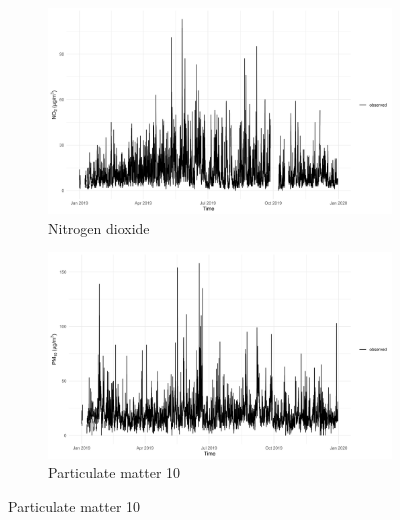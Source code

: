          \begin{figure}[H]
            \centering
            \begin{subfigure}{0.48\linewidth}
               \centering
               \includegraphics[width=\linewidth]{../images/extracted_data_no2.png}
            \caption{Nitrogen dioxide}
            \end{subfigure}
            \hfill
            \begin{subfigure}{0.48\linewidth}
               \centering
               \includegraphics[width=\linewidth]{../images/extracted_data_pm10.png}
               \caption{Particulate matter 10}
            \end{subfigure}
            
            \vspace{0.5em}


\end{figure}
